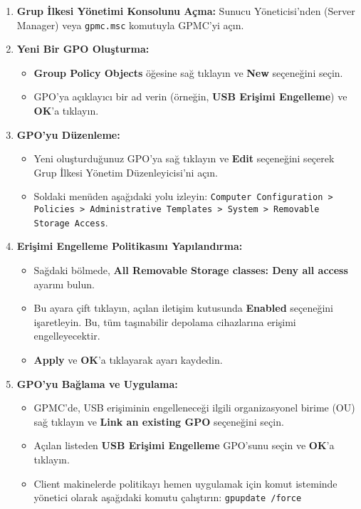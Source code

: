 \begin{enumerate}
    \item \textbf{Grup İlkesi Yönetimi Konsolunu Açma:} Sunucu Yöneticisi'nden (Server Manager) veya \texttt{gpmc.msc} komutuyla GPMC'yi açın.
    \item \textbf{Yeni Bir GPO Oluşturma:}
    \begin{itemize}
        \item \textbf{Group Policy Objects} öğesine sağ tıklayın ve \textbf{New} seçeneğini seçin.
        \item GPO'ya açıklayıcı bir ad verin (örneğin, \textbf{USB Erişimi Engelleme}) ve \textbf{OK}'a tıklayın.
    \end{itemize}
    \item \textbf{GPO'yu Düzenleme:}
    \begin{itemize}
        \item Yeni oluşturduğunuz GPO'ya sağ tıklayın ve \textbf{Edit} seçeneğini seçerek Grup İlkesi Yönetim Düzenleyicisi'ni açın.
        \item Soldaki menüden aşağıdaki yolu izleyin: \texttt{Computer Configuration > Policies > Administrative Templates > System > Removable Storage Access}.
    \end{itemize}
    \item \textbf{Erişimi Engelleme Politikasını Yapılandırma:}
    \begin{itemize}
        \item Sağdaki bölmede, \textbf{All Removable Storage classes: Deny all access} ayarını bulun.
        \item Bu ayara çift tıklayın, açılan iletişim kutusunda \textbf{Enabled} seçeneğini işaretleyin. Bu, tüm taşınabilir depolama cihazlarına erişimi engelleyecektir.
        \item \textbf{Apply} ve \textbf{OK}'a tıklayarak ayarı kaydedin.
    \end{itemize}
    \item \textbf{GPO'yu Bağlama ve Uygulama:}
    \begin{itemize}
        \item GPMC'de, USB erişiminin engelleneceği ilgili organizasyonel birime (OU) sağ tıklayın ve \textbf{Link an existing GPO} seçeneğini seçin.
        \item Açılan listeden \textbf{USB Erişimi Engelleme} GPO'sunu seçin ve \textbf{OK}'a tıklayın.
        \item Client makinelerde politikayı hemen uygulamak için komut isteminde yönetici olarak aşağıdaki komutu çalıştırın: \texttt{gpupdate /force}
    \end{itemize}
\end{enumerate}

